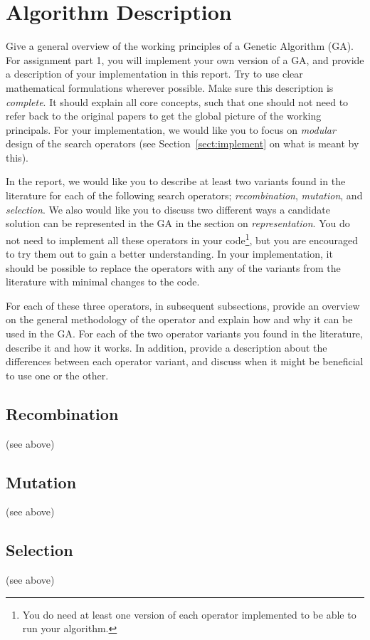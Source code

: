 \documentclass[runningheads]{llncs}
\begin{document}
\section{Algorithm Description} \label{sec:description}
Give a general overview of the working principles of a Genetic Algorithm (GA). For assignment part 1, you will implement your own version of a GA, and provide a description of your implementation in this report. Try to use clear mathematical formulations wherever possible. Make sure this description is \emph{complete}. It should explain all core concepts, such that one should not need to refer back to the original papers to get the global picture of the working principals. For your implementation, we would like you to focus on \emph{modular} design of the search operators (see Section~\ref{sect:implement} on what is meant by this). 

In the report, we would like you to describe at least two variants found in the literature for each of the following search operators; \emph{recombination}, \emph{mutation}, and \emph{selection}. We also would like you to discuss two different ways a candidate solution can be represented in the GA in the section on \emph{representation}. You do not need to implement all these operators in your code\footnote{You do need at least one version of each operator implemented to be able to run your algorithm.}, but you are encouraged to try them out to gain a better understanding. In your implementation, it should be possible to replace the operators with any of the variants from the literature with minimal changes to the code.

For each of these three operators, in subsequent subsections, provide an overview on the general methodology of the operator and explain how and why it can be used in the GA. For each of the two operator variants you found in the literature, describe it and how it works. In addition, provide a description about the differences between each operator variant, and discuss when it might be beneficial to use one or the other.

\subsection{Recombination}
(see above)
\subsection{Mutation}
(see above)
\subsection{Selection}
(see above)
\end{document}
